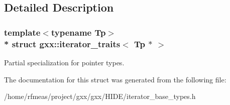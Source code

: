 \subsection{Detailed Description}
\subsubsection*{template$<$typename Tp$>$\\*
struct gxx\+::iterator\+\_\+traits$<$ Tp $\ast$ $>$}

Partial specialization for pointer types. 

The documentation for this struct was generated from the following file\+:\begin{DoxyCompactItemize}
\item 
/home/rfmeas/project/gxx/gxx/\+H\+I\+D\+E/iterator\+\_\+base\+\_\+types.\+h\end{DoxyCompactItemize}

